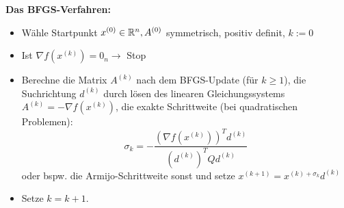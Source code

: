 \textbf{Das BFGS-Verfahren:}
\begin{itemize}
 \item Wähle Startpunkt $x^{(0)} \in \mathbb R^n, A^{(0)}$ symmetrisch, positiv definit, $k := 0$
 \item Ist $\nabla f(x^{(k)}) = 0_n \rightarrow$ Stop
 \item Berechne die Matrix $A^{(k)}$ nach dem BFGS-Update (für $k \geq 1$), die
Suchrichtung $d^{(k)}$ durch lösen des linearen Gleichungssystems
$A^{(k)} = -\nabla f(x^{(k)})$, die exakte Schrittweite (bei quadratischen Problemen):
\[\sigma_k=-\frac{(\nabla f(x^{(k)}))^Td^{(k)}}{(d^{(k)})^TQd^{(k)}}\]
oder bspw. die Armijo-Schrittweite sonst und setze $x^{(k+1)} = x^{(k)+\sigma_k}d^{(k)}$
\item Setze $k=k+1$.
\end{itemize}
